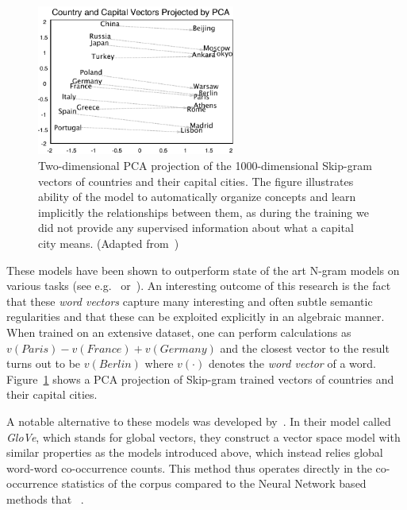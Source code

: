 \begin{figure}
  \begin{center}
    \includegraphics[width=0.58\textwidth]{img/word2vec_cities.pdf}
  \end{center}
  \caption{Two-dimensional PCA projection of the 1000-dimensional Skip-gram vectors of countries and their capital cities. The figure illustrates ability of the model to automatically organize concepts and learn implicitly the relationships between them, as during the training we did not provide any supervised information about what a capital city means. (Adapted from~\cite{Mikolov:2013ac})}
\label{fig:word2vec-cities}
\end{figure}

These models have been shown to outperform state of the art N-gram models on various tasks (see e.g.~\cite{bengio2003neural} or~\cite{Mikolov:2012aa}). An interesting outcome of this research is the fact that these \emph{word vectors} capture many interesting and often subtle semantic regularities and that these can be exploited explicitly in an algebraic manner. When trained on an extensive dataset, one can perform calculations as $v(Paris) - v(France) + v(Germany)$ and the closest vector to the result turns out to be $v(Berlin)$ where $v(\cdot)$ denotes the \emph{word vector} of a word. Figure~\ref{fig:word2vec-cities} shows a PCA projection of Skip-gram trained vectors of countries and their capital cities.

A notable alternative to these models was developed by~\cite{Peannington:2014aa}. In their model called \emph{GloVe}, which stands for global vectors, they construct a vector space model with similar properties as the models introduced above, which instead relies global word-word co-occurrence counts. This method thus operates directly in the co-occurrence statistics of the corpus compared to the Neural Network based methods that ~\cite{Peannington:2014aa}.

